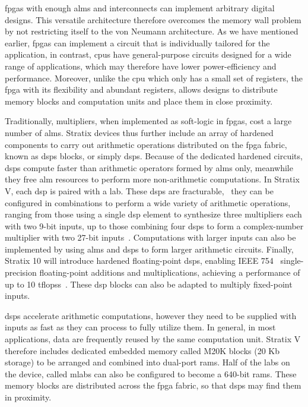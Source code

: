 
\Glspl{fpga} with enough \glspl{alm} and interconnects can implement arbitrary
digital designs.  This versatile architecture therefore overcomes the memory
wall problem by not restricting itself to the von Neumann architecture.  As
we have mentioned earlier, \glspl{fpga} can implement a circuit that is
individually tailored for the application, in contrast, \glspl{cpu} have
general-purpose circuits designed for a wide range of applications, which may
therefore have lower power-efficiency and performance.  Moreover, unlike the
\gls{cpu} which only has a small set of registers, the \gls{fpga} with its
flexibility and abundant registers, allows designs to distribute memory blocks
and computation units and place them in close proximity.

Traditionally, multipliers, when implemented as soft-logic in \glspl{fpga},
cost a large number of \glspl{alm}.  Stratix devices thus further include an
array of hardened components to carry out arithmetic operations distributed
on the \gls{fpga} fabric, known as \glspl{dsp} blocks, or simply \glspl{dsp}.
Because of the dedicated hardened circuits, \glspl{dsp} compute faster
than arithmetic operators formed by \glspl{alm} only, meanwhile they free
\gls{alm} resources to perform more non-arithmetic computations.  In
Stratix V, each \gls{dsp} is paired with a \gls{lab}\@.  These \glspl{dsp}
are fracturable, \ie~they can be configured in combinations to perform a
wide variety of arithmetic operations, ranging from those using a single
\gls{dsp} element to synthesize three multipliers each with two 9-bit
inputs, up to those combining four \glspl{dsp} to form a complex-number
multiplier with two 27-bit inputs~\cite{stratix5}.  Computations with larger
inputs can also be implemented by using \glspl{alm} and \glspl{dsp} to form
larger arithmetic circuits.  Finally, Stratix 10 will introduce hardened
floating-point \glspl{dsp}, enabling IEEE 754~\cite{ieee754} single-precision
floating-point additions and multiplications, achieving a performance of up
to 10 \glspl{tflops}~\cite{stratix10fp}.  These \gls{dsp} blocks can also be
adapted to multiply fixed-point inputs.

\Glspl{dsp} accelerate arithmetic computations, however they need to be
supplied with inputs as fast as they can process to fully utilize them.
In general, in most applications, data are frequently reused by the same
computation unit.  Stratix V therefore includes dedicated embedded memory
called M20K blocks (20 Kb storage) to be arranged and combined into dual-port
\glspl{ram}.  Half of the \glspl{lab} on the device, called \glspl{mlab} can
also be configured to become a 640-bit \glspl{ram}.  These memory blocks are
distributed across the \gls{fpga} fabric, so that \glspl{dsp} may find them in
proximity.


